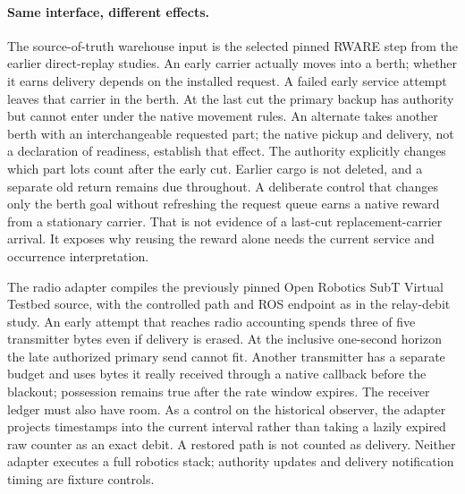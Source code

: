 \documentclass{article}
\begin{document}
\paragraph{Same interface, different effects.}
The source-of-truth warehouse input is the selected pinned RWARE step from the earlier direct-replay studies. An early carrier actually moves into a berth; whether it earns delivery depends on the installed request. A failed early service attempt leaves that carrier in the berth. At the last cut the primary backup has authority but cannot enter under the native movement rules. An alternate takes another berth with an interchangeable requested part; the native pickup and delivery, not a declaration of readiness, establish that effect. The authority explicitly changes which part lots count after the early cut. Earlier cargo is not deleted, and a separate old return remains due throughout. A deliberate control that changes only the berth goal without refreshing the request queue earns a native reward from a stationary carrier. That is not evidence of a last-cut replacement-carrier arrival. It exposes why reusing the reward alone needs the current service and occurrence interpretation.

The radio adapter compiles the previously pinned Open Robotics SubT Virtual Testbed source, with the controlled path and ROS endpoint as in the relay-debit study. An early attempt that reaches radio accounting spends three of five transmitter bytes even if delivery is erased. At the inclusive one-second horizon the late authorized primary send cannot fit. Another transmitter has a separate budget and uses bytes it really received through a native callback before the blackout; possession remains true after the rate window expires. The receiver ledger must also have room. As a control on the historical observer, the adapter projects timestamps into the current interval rather than taking a lazily expired raw counter as an exact debit. A restored path is not counted as delivery. Neither adapter executes a full robotics stack; authority updates and delivery notification timing are fixture controls.
\end{document}
